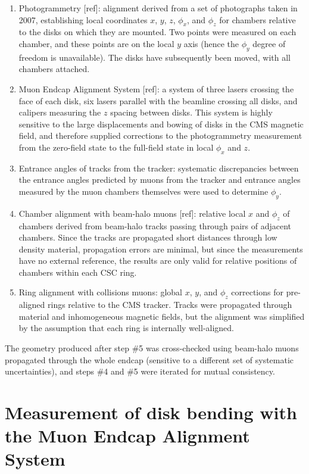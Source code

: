\documentclass[12pt]{article}
\begin{document}
\begin{enumerate}
\item Photogrammetry [ref]: alignment derived from a set of
  photographs taken in 2007, establishing local coordinates $x$, $y$,
  $z$, $\phi_x$, and $\phi_z$ for chambers relative to the disks on
  which they are mounted.  Two points were measured on each chamber,
  and these points are on the local $y$ axis (hence the $\phi_y$
  degree of freedom is unavailable).  The disks have subsequently been
  moved, with all chambers attached.
\item Muon Endcap Alignment System [ref]: a system of three lasers
  crossing the face of each disk, six lasers parallel with the
  beamline crossing all disks, and calipers measuring the $z$ spacing
  between disks.  This system is highly sensitive to the large
  displacements and bowing of disks in the CMS magnetic field, and
  therefore supplied corrections to the photogrammetry measurement
  from the zero-field state to the full-field state in local $\phi_x$
  and $z$.
\item Entrance angles of tracks from the tracker: systematic
  discrepancies between the entrance angles predicted by muons from
  the tracker and entrance angles measured by the muon chambers
  themselves were used to determine $\phi_y$.
\item Chamber alignment with beam-halo muons [ref]: relative local $x$
  and $\phi_z$ of chambers derived from beam-halo tracks passing
  through pairs of adjacent chambers.  Since the tracks are propagated
  short distances through low density material, propagation errors are
  minimal, but since the measurements have no external reference, the
  results are only valid for relative positions of chambers within
  each CSC ring.
\item Ring alignment with collisions muons: global $x$, $y$, and
  $\phi_z$ corrections for pre-aligned rings relative to the CMS
  tracker.  Tracks were propagated through material and inhomogeneous
  magnetic fields, but the alignment was simplified by the assumption
  that each ring is internally well-aligned.
\end{enumerate}
The geometry produced after step \#5 was cross-checked using beam-halo
muons propagated through the whole endcap (sensitive to a different
set of systematic uncertainties), and steps \#4 and \#5 were iterated
for mutual consistency.

\section{Measurement of disk bending with the Muon Endcap Alignment System}
\end{document}
